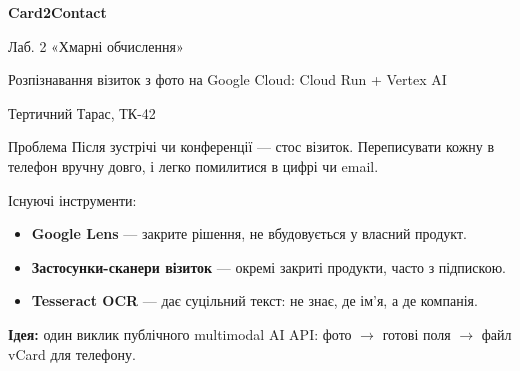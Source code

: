 \documentclass[aspectratio=169,11pt]{beamer}
\begin{document}
{
\begin{frame}
  \centering
  {\Huge\bfseries Card2Contact\par}
  \vspace{1.4em}
  {\Large Лаб. 2 «Хмарні обчислення»\par}
  \vspace{1.2em}
  {\large Розпізнавання візиток з фото на Google Cloud: Cloud Run + Vertex AI\par}
  \vspace{2.6em}
  {\Large Тертичний Тарас, ТК-42\par}
\end{frame}
}

\begin{frame}{Проблема}
  Після зустрічі чи конференції --- стос візиток. Переписувати кожну в телефон вручну
  довго, і легко помилитися в цифрі чи email.

  \bigskip
  Існуючі інструменти:
  \begin{itemize}
    \item \textbf{Google Lens} --- закрите рішення, не вбудовується у власний продукт.
    \item \textbf{Застосунки-сканери візиток} --- окремі закриті продукти, часто з підпискою.
    \item \textbf{Tesseract OCR} --- дає суцільний текст: не знає, де ім'я, а де компанія.
  \end{itemize}

  \bigskip
  \textbf{Ідея:} один виклик публічного multimodal AI API: фото $\to$ готові поля $\to$ файл vCard для телефону.
\end{frame}
\end{document}
